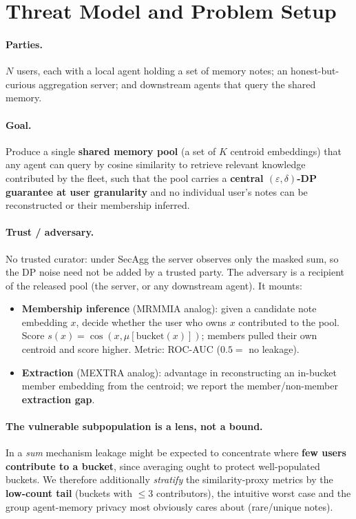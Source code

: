 \documentclass[pdflatex,sn-mathphys-num,12pt]{sn-jnl}
\theoremstyle{thmstyleone}%
\theoremstyle{thmstyletwo}%
\theoremstyle{thmstylethree}%
\newcommand{\eps}{\varepsilon}
\begin{document}
\section{Threat Model and Problem Setup}\label{sec:threat}

\paragraph{Parties.} $N$ users, each with a local agent holding a set of memory
notes; an honest-but-curious aggregation server; and downstream agents that query
the shared memory.

\paragraph{Goal.} Produce a single \textbf{shared memory pool} (a set of $K$
centroid embeddings) that any agent can query by cosine similarity to retrieve
relevant knowledge contributed by the fleet, such that the pool carries a
\textbf{central $(\eps, \delta)$-DP guarantee at user granularity} and no
individual user's notes can be reconstructed or their membership inferred.

\paragraph{Trust / adversary.} No trusted curator: under SecAgg the server
observes only the masked sum, so the DP noise need not be added by a trusted
party. The adversary is a recipient of the released pool (the server, or any
downstream agent). It mounts:
\begin{itemize}
  \item \textbf{Membership inference} (MRMMIA analog): given a candidate note
    embedding $x$, decide whether the user who owns $x$ contributed to the pool.
    Score $s(x) = \cos(x, \mu[\mathrm{bucket}(x)])$; members pulled their own
    centroid and score higher. Metric: ROC-AUC ($0.5 =$ no leakage).
  \item \textbf{Extraction} (MEXTRA analog): advantage in reconstructing an
    in-bucket member embedding from the centroid; we report the
    member/non-member \textbf{extraction gap}.
\end{itemize}

\paragraph{The vulnerable subpopulation is a lens, not a bound.} In a \emph{sum} mechanism
leakage might be expected to concentrate where \textbf{few users contribute to a bucket},
since averaging ought to protect well-populated buckets. We therefore additionally
\emph{stratify} the similarity-proxy metrics by the \textbf{low-count tail} (buckets with
$\leq 3$ contributors), the intuitive worst case and the group agent-memory privacy most
obviously cares about (rare/unique notes).
\end{document}
